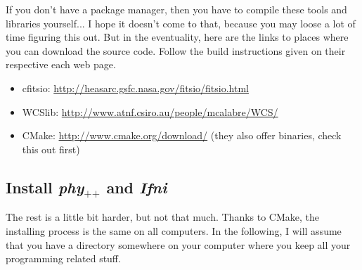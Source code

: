 \documentclass[12pt,a4paper]{article}
\newcommand{\phypp}{\textit{phy}$_{\text{++}}$\xspace}
\newcommand{\ifni}{\textit{Ifni}\xspace}
\begin{document}
If you don't have a package manager, then you have to compile these tools and libraries yourself... I hope it doesn't come to that, because you may loose a lot of time figuring this out. But in the eventuality, here are the links to places where you can download the source code. Follow the build instructions given on their respective each web page.
\begin{itemize}
\item cfitsio: \url{http://heasarc.gsfc.nasa.gov/fitsio/fitsio.html}
\item WCSlib: \url{http://www.atnf.csiro.au/people/mcalabre/WCS/}
\item CMake: \url{http://www.cmake.org/download/} (they also offer binaries, check this out first)
\end{itemize}

\subsection{Install \phypp and \ifni}

The rest is a little bit harder, but not that much. Thanks to CMake, the installing process is the same on all computers. In the following, I will assume that you have a directory somewhere on your computer where you keep all your programming related stuff.
\end{document}

